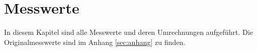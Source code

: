 \section{Messwerte}
\label{sec:messwerte}
In diesem Kapitel sind alle Messwerte und deren Umrechnungen aufgeführt. Die Originalmesswerte 
sind im Anhang \autoref{sec:anhang} zu finden.
